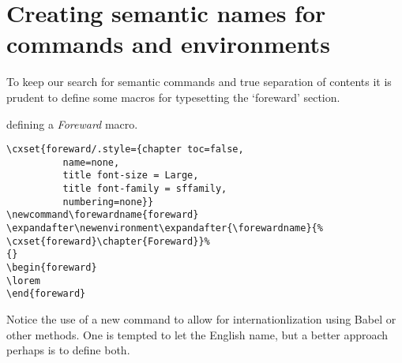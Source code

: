 \section{Creating semantic names for commands and environments}

To keep our search for semantic commands and true separation of contents it is prudent to define some macros for typesetting the  `foreward' section.

\bgroup
\begin{texexample}{defining a \textit{Foreward} macro.}{}
\begin{lstlisting}
\cxset{foreward/.style={chapter toc=false,
          name=none,
          title font-size = Large,
          title font-family = sffamily,
          numbering=none}}
\newcommand\forewardname{foreward}
\expandafter\newenvironment\expandafter{\forewardname}{%
\cxset{foreward}\chapter{Foreward}}%
{}
\begin{foreward}
\lorem
\end{foreward}
\end{lstlisting}
\end{texexample}
\egroup

Notice the use of a new command \cmd{\forewardname} to allow for internationlization using Babel or other methods. One is tempted to let the English name, but a better approach perhaps is to define both.

\makeatletter
\endinput

